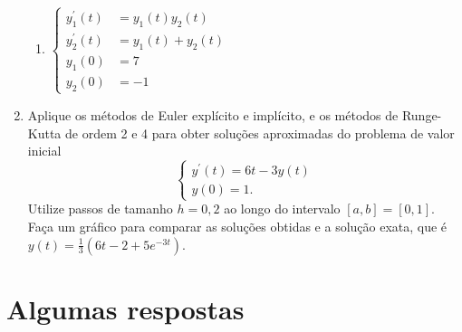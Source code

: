 \documentclass[12pt,a4paper]{article}
\begin{document}
\begin{enumerate}
\begin{multicols}{2}
\begin{enumerate}
\item $\begin{cases}
y_1^\prime(t) &= y_1(t) y_2(t)\\
y_2^\prime(t) &= y_1(t)+y_2(t)\\
y_1(0) &= 7\\
y_2(0) &= -1
\end{cases}$
\end{enumerate}
\end{multicols}

\item Aplique os métodos de Euler explícito e implícito, e os métodos de Runge-Kutta de ordem 2 e 4 para obter soluções aproximadas do problema de valor inicial
\[
\begin{cases}
y^\prime(t) = 6t - 3y(t) \\
y(0) = 1.
\end{cases}\]
Utilize passos de tamanho $h = 0,2$ ao longo do intervalo $[a, b] = [0, 1]$. Faça um gráfico para comparar as soluções obtidas e a solução exata, que é $y(t) = \frac{1}{3} (6 t - 2 + 5 e^{-3 t})$.
\end{enumerate}


\newpage
\section*{Algumas respostas}
\end{document}
